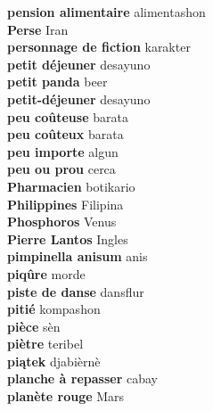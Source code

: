 \textbf{ pension alimentaire  } alimentashon \\
\textbf{ Perse  } Iran \\
\textbf{ personnage de fiction  } karakter \\
\textbf{ petit déjeuner  } desayuno \\
\textbf{ petit panda  } beer \\
\textbf{ petit-déjeuner  } desayuno \\
\textbf{ peu coûteuse  } barata \\
\textbf{ peu coûteux  } barata \\
\textbf{ peu importe  } algun \\
\textbf{ peu ou prou  } cerca \\
\textbf{ Pharmacien  } botikario \\
\textbf{ Philippines  } Filipina \\
\textbf{ Phosphoros  } Venus \\
\textbf{ Pierre Lantos  } Ingles \\
\textbf{ pimpinella anisum  } anis \\
\textbf{ piqûre  } morde \\
\textbf{ piste de danse  } dansflur \\
\textbf{ pitié  } kompashon \\
\textbf{ pièce  } sèn \\
\textbf{ piètre  } teribel \\
\textbf{ piątek  } djabièrnè \\
\textbf{ planche à repasser  } cabay \\
\textbf{ planète rouge  } Mars \\
